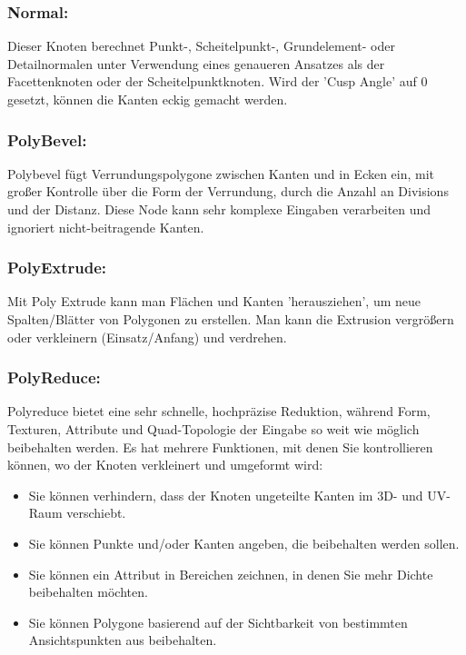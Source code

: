 \documentclass[paper=a4,fontsize=12pt,ngerman]{scrartcl}
\begin{document}
	\subsubsection*{Normal:}
	Dieser Knoten berechnet Punkt-, Scheitelpunkt-, Grundelement- oder Detailnormalen unter Verwendung eines genaueren Ansatzes als der Facettenknoten oder der Scheitelpunktknoten. Wird der 'Cusp Angle' auf 0 gesetzt, können die Kanten eckig gemacht werden.
	\subsubsection*{PolyBevel:}
	Polybevel fügt Verrundungspolygone zwischen Kanten und in Ecken ein, mit großer Kontrolle über die Form der Verrundung, durch die Anzahl an Divisions und der Distanz. Diese Node kann sehr komplexe Eingaben verarbeiten und ignoriert nicht-beitragende Kanten.
	\subsubsection*{PolyExtrude:}
	Mit Poly Extrude kann man Flächen und Kanten 'herausziehen', um neue Spalten/Blätter von Polygonen zu erstellen. Man kann die Extrusion vergrößern oder verkleinern (Einsatz/Anfang) und verdrehen. 
	\subsubsection*{PolyReduce:}
	Polyreduce bietet eine sehr schnelle, hochpräzise Reduktion, während Form, Texturen, Attribute und Quad-Topologie der Eingabe so weit wie möglich beibehalten werden. Es hat mehrere Funktionen, mit denen Sie kontrollieren können, wo der Knoten verkleinert und umgeformt wird:
	\begin{itemize}
		\item Sie können verhindern, dass der Knoten ungeteilte Kanten im 3D- und UV- Raum verschiebt.
		\item Sie können Punkte und/oder Kanten angeben, die beibehalten werden sollen. 
		\item Sie können ein Attribut in Bereichen zeichnen, in denen Sie mehr Dichte beibehalten möchten. 
		\item Sie können Polygone basierend auf der Sichtbarkeit von bestimmten Ansichtspunkten aus beibehalten. 
	\end{itemize}
\end{document}

